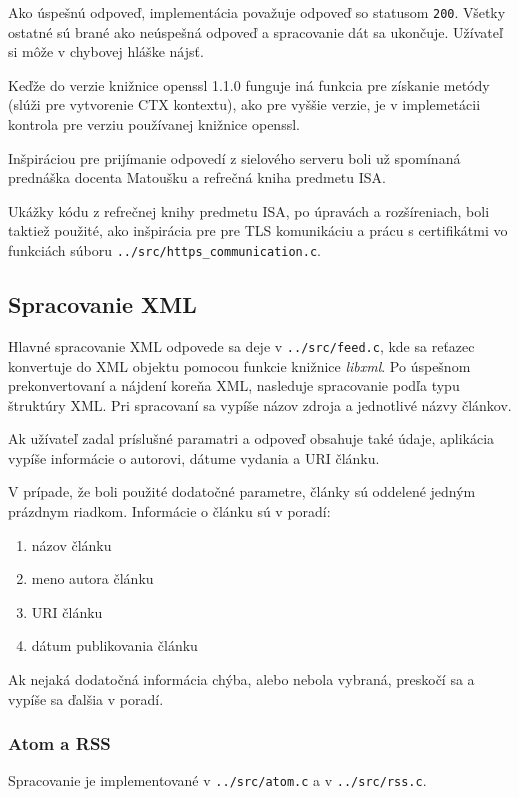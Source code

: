 Ako úspešnú odpoveď, implementácia považuje odpoveď so statusom {\tt 200}. Všetky ostatné\cite{ibmHttp} sú brané ako neúspešná odpoveď a spracovanie dát sa ukončuje. Užívateľ si môže v chybovej hláške nájsť.

Keďže do verzie knižnice openssl 1.1.0 funguje iná funkcia pre získanie metódy (slúži pre vytvorenie CTX kontextu), ako pre vyššie verzie, je v implemetácii kontrola pre verziu používanej knižnice openssl\cite{openSslMet}.

Inšpiráciou pre prijímanie odpovedí z sielového serveru boli už spomínaná prednáška docenta Matoušku\cite{Matousek} a refrečná kniha predmetu ISA\cite{Winkle}.

Ukážky kódu z refrečnej knihy predmetu ISA\cite{Winkle}, po úpravách a rozšíreniach, boli taktiež použité, ako inšpirácia pre pre TLS komunikáciu a prácu s certifikátmi vo funkciách súboru {\tt ../src/https\_communication.c}.

\subsection*{Spracovanie XML}
Hlavné spracovanie XML odpovede sa deje v {\tt ../src/feed.c}, kde sa reťazec konvertuje do XML objektu pomocou funkcie knižnice {\it libxml}\cite{libxml}. Po úspešnom prekonvertovaní a nájdení koreňa XML, nasleduje spracovanie podľa typu štruktúry XML. Pri spracovaní sa vypíše názov zdroja a jednotlivé názvy článkov. 

Ak užívateľ zadal príslušné paramatri a odpoveď obsahuje také údaje, aplikácia vypíše informácie o autorovi, dátume vydania a URI článku. 

V prípade, že boli použité dodatočné parametre, články sú oddelené jedným prázdnym riadkom. Informácie o článku sú v poradí:
\begin{enumerate}
  \item{názov článku}
  \item{meno autora článku}
  \item{URI článku}
  \item{dátum publikovania článku}
\end{enumerate}

Ak nejaká dodatočná informácia chýba, alebo nebola vybraná, preskočí sa a vypíše sa ďalšia v poradí.

\subsubsection{Atom a RSS}
Spracovanie je implementované v {\tt ../src/atom.c}\cite{atomSpec} a v {\tt ../src/rss.c}\cite{rssSpec}.

